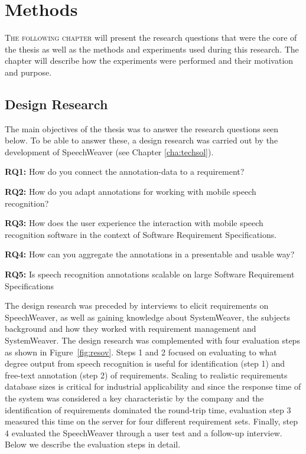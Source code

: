 \chapter{Methods}
\label{chap:meth}
\lettrine[lines=4, loversize=-0.1, lraise=0.1]{T}{he following chapter} will present the research questions that were the core of the thesis as well as the methods and experiments used during this research. The chapter will describe how the experiments were performed and their motivation and purpose.
\section{Design Research}
The main objectives of the thesis was to answer the research questions seen below. To be able to answer these, a design research was carried out by the development of SpeechWeaver (see Chapter \ref{cha:techsol}). 

\begin{framed}
\begin{flushleft}
    \textbf{RQ1:} How do you connect the annotation-data to a requirement?
    
    \textbf{RQ2:} How do you adapt annotations for working with mobile speech recognition?
    
    \textbf{RQ3:} How does the user experience the interaction with mobile speech recognition
    software in the context of Software Requirement Specifications.
    
    \textbf{RQ4:} How can you aggregate the annotations in a presentable and usable way?
    
    \textbf{RQ5:} Is speech recognition annotations scalable on large Software Requirement Specifications
\end{flushleft}
\end{framed}

The design research was preceded by interviews to elicit requirements on SpeechWeaver, as well as gaining knowledge about SystemWeaver, the subjects background and how they worked with requirement management and SystemWeaver. The design research was complemented with four evaluation steps as shown in Figure~\ref{fig:resov}.
Steps 1 and 2 focused on evaluating to what degree output from speech recognition is useful for identification (step 1) and free-text annotation (step 2) of requirements.
Scaling to realistic requirements database sizes is critical for industrial applicability and since the response time of the system was considered a key characteristic by the company and the identification of requirements dominated the round-trip time, evaluation step 3 measured this time on the server for four different requirement sets.
Finally, step 4 evaluated the SpeechWeaver through a user test and a follow-up interview.
Below we describe the evaluation steps in detail.



